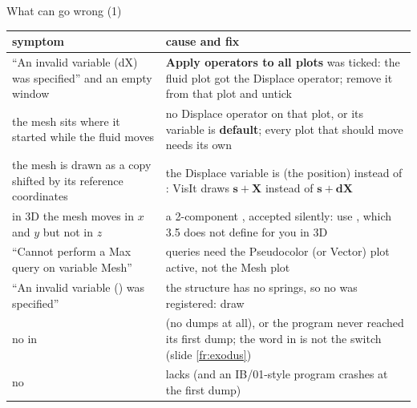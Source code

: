 \documentclass[aspectratio=169,11pt]{beamer}
\newcommand{\gui}[1]{\textsf{\textbf{#1}}}
\begin{document}
\begin{frame}{What can go wrong (1)}
\label{fr:wrong}
\scriptsize
\renewcommand{\arraystretch}{0.95}
\begin{tabular}{@{}L{0.36\textwidth}L{0.57\textwidth}@{}}
\toprule
symptom & cause and fix \\
\midrule
``An invalid variable (dX) was specified'' and an empty window & \gui{Apply operators to all plots} was ticked: the fluid plot got the Displace operator; remove it from that plot and untick \\
the mesh sits where it started while the fluid moves & no Displace operator on that plot, or its variable is \gui{default}; every plot that should move needs its own \\
the mesh is drawn as a copy shifted by its reference coordinates & the Displace variable is  (the position) instead of : VisIt draws $\mathbf{s} + \mathbf{X}$ instead of $\mathbf{s} + \mathbf{dX}$ \\
in 3D the mesh moves in $x$ and $y$ but not in $z$ & a 2-component , accepted silently: use , which 3.5 does not define for you in 3D \\
``Cannot perform a Max query on variable Mesh'' & queries need the Pseudocolor (or Vector) plot active, not the Mesh plot \\
``An invalid variable () was specified'' & the structure has no springs, so no  was registered: draw  \\
no  in  &  (no dumps at all), or the program never reached its first dump; the  word in  is not the switch (slide \ref{fr:exodus}) \\
no  &  lacks  (and an IB/01-style program crashes at the first dump) \\
\bottomrule
\end{tabular}
\end{frame}
\end{document}
